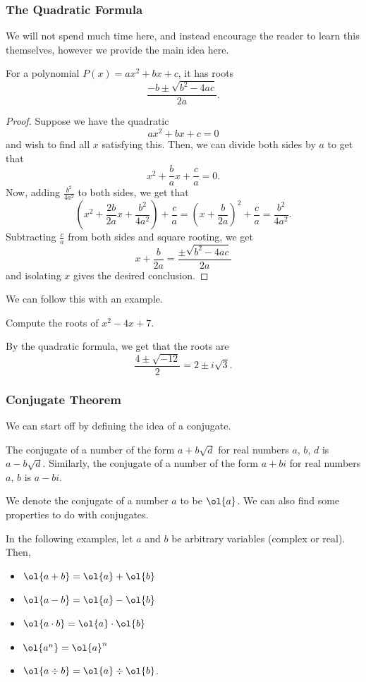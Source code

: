 \documentclass[11pt]{scrartcl}
\begin{document}
\subsubsection{The Quadratic Formula}

We will not spend much time here, and instead encourage the reader to learn this themselves, however we provide the main idea here.

\begin{theorem*}
For a polynomial $P(x) = ax^2+bx+c$, it has roots \[\dfrac{-b\pm\sqrt{b^2-4ac}}{2a}.\]
\end{theorem*}
\begin{proof}
Suppose we have the quadratic \[ax^2+bx+c = 0\] and wish to find all $x$ satisfying this. Then, we can divide both sides by $a$ to get that \[x^2+\dfrac{b}{a}x+\dfrac{c}{a} = 0.\] Now, adding $\tfrac{b^2}{4a^2}$ to both sides, we get that \[\left(x^2+\dfrac{2b}{2a}x+\dfrac{b^2}{4a^2}\right)+\dfrac{c}{a} = \left(x+\dfrac{b}{2a}\right)^2+\dfrac{c}{a} = \dfrac{b^2}{4a^2}.\] Subtracting $\tfrac{c}{a}$ from both sides and square rooting, we get \[x+\dfrac{b}{2a} = \dfrac{\pm\sqrt{b^2-4ac}}{2a}\] and isolating $x$ gives the desired conclusion.
\end{proof}

We can follow this with an example.

\begin{example*}
Compute the roots of $x^2-4x+7$.
\end{example*}

By the quadratic formula, we get that the roots are \[\dfrac{4\pm\sqrt{-12}}{2} = 2\pm i\sqrt{3}.\]

\subsubsection{Conjugate Theorem}

We can start off by defining the idea of a conjugate.

\begin{definition*}[Conjugate]
The conjugate of a number of the form $a+b\sqrt{d}$ for real numbers $a$, $b$, $d$ is $a-b\sqrt{d}$. Similarly, the conjugate of a number of the form $a+bi$ for real numbers $a$, $b$ is $a-bi$.
\end{definition*}

We denote the conjugate of a number $a$ to be $\ol{a}$. We can also find some properties to do with conjugates.

\begin{lemma*}
In the following examples, let $a$ and $b$ be arbitrary variables (complex or real). Then,
\begin{itemize}
\item $\ol{a+b} = \ol{a}+\ol{b}$
\item $\ol{a-b} = \ol{a}-\ol{b}$
\item $\ol{a\cdot b} = \ol{a}\cdot\ol{b}$
\item $\ol{a^n} = \ol{a}^n$
\item $\ol{a\div b} = \ol{a}\div \ol{b}$.
\end{itemize}
\end{lemma*}
\end{document}

